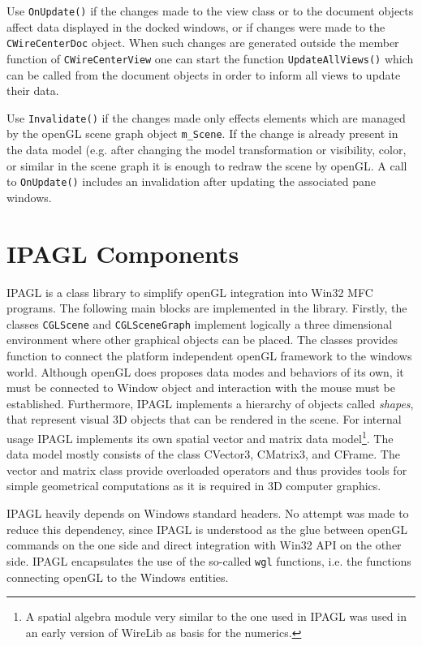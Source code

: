\documentclass[11pt,a4paper,onepage,openany]{book}
\begin{document}
Use \texttt{OnUpdate()} if the changes made to the view class or to the
document objects affect data displayed in the docked windows, or if changes
were made to the \texttt{CWireCenterDoc} object. When such changes are
generated outside the member function of \texttt{CWireCenterView} one can start
the function \texttt{UpdateAllViews()} which can be called from the document
objects in order to inform all views to update their data.

Use \texttt{Invalidate()} if the changes made only effects elements which are
managed by the openGL scene graph object \texttt{m\_Scene}. If the change is
already present in the data model (e.g. after changing the model transformation
or visibility, color, or similar in the scene graph it is enough to redraw the
scene by openGL. A call to \texttt{OnUpdate()} includes an invalidation after
updating the associated pane windows.

\chapter{IPAGL Components}
IPAGL is a class library to simplify openGL integration into Win32 MFC
programs. The following main blocks are implemented in the library. Firstly,
the classes \texttt{CGLScene} and \texttt{CGLSceneGraph} implement logically a
three dimensional environment where other graphical objects can be placed. The
classes provides function to connect the platform independent openGL framework
to the windows world. Although openGL does proposes data modes and behaviors of
its own, it must be connected to Window object and interaction with the mouse
must be established. Furthermore, IPAGL implements a hierarchy of objects
called \emph{shapes}, that represent visual 3D objects that can be rendered in
the scene. For internal usage IPAGL implements its own spatial vector and
matrix data model\footnote{A spatial algebra module very similar to the one
used in IPAGL was used in an early version of WireLib as basis for the
numerics.}. The data model mostly consists of the class CVector3, CMatrix3, and
CFrame. The vector and matrix class provide overloaded operators and thus
provides tools for simple geometrical computations as it is required in 3D
computer graphics.

IPAGL heavily depends on Windows standard headers. No attempt was made to
reduce this dependency, since IPAGL is understood as the glue between openGL
commands on the one side and direct integration with Win32 API on the other
side. IPAGL encapsulates the use of the so-called \texttt{wgl} functions, i.e.
the functions connecting openGL to the Windows entities.
\end{document}
